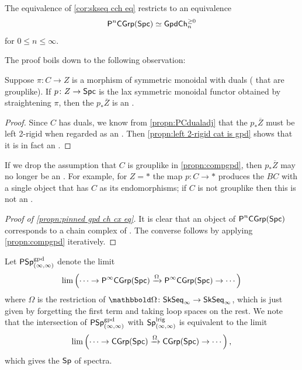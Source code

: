 \documentclass[a4paper,11pt]{article}
\begin{document}
\begin{propn}\label{propn:pinned gpd ch cx eq}
  The equivalence of \cref{cor:skseq cch eq} restricts to an
  equivalence
  \[ \PCGrp[n] \simeq \GpdChp_{n}\]
  for $0 \leq n \leq \infty$.
\end{propn}

The proof boils down to the following observation:
\begin{lemma}\label{propn:compgpd}
  Suppose $\pi \colon C \to Z$ is a morphism of symmetric monoidal
  \igpds{} with duals (\ie{} that are grouplike). If $p \colon Z \to
  \Spc$ is the lax symmetric monoidal functor obtained by
  straightening $\pi$, then the \icat{} $p_{*}\overline{Z}$ is an
  \igpd{}.
\end{lemma}
\begin{proof}
  Since $C$ has duals, we know from \cref{propn:PCdualadj} that the
  \icat{} $p_{*}\overline{Z}$ must be left 2-rigid when regarded as an
  \itcat{}. Then \cref{propn:left 2-rigid cat is gpd} shows that it is
  in fact an \igpd{}.
\end{proof}

\begin{remark}
  If we drop the assumption that $C$ is grouplike in
  \cref{propn:compgpd}, then $p_{*}\overline{Z}$ may no longer be an
  \igpd{}. For example, for $Z = *$ the map $p \colon C \to *$
  produces the \icat{} $BC$ with a single object that has $C$ as its
  endomorphisms; if $C$ is not grouplike then this is not an \igpd{}.
\end{remark}

\begin{proof}[Proof of \cref{propn:pinned gpd ch cx eq}]
  It is clear that an object of $\PCGrp[n]$ corresponds to a chain
  complex of \igpds{}. The converse follows by applying
  \cref{propn:compgpd} iteratively.
\end{proof}

\begin{notation}
  Let $\PSpIIgpd$ denote the limit
  \[ \lim \left( \cdots \to \PCGrp[\infty] \xto{\Omega} \PCGrp[\infty]
      \to \cdots
    \right)\]
  where $\Omega$ is the restriction of $\mOm \colon \SkSeqI \to
  \SkSeqI$, which is just given by forgetting the first term and
  taking loop spaces on the rest. We note that the intersection of
  $\PSpIIgpd$ with $\SpIIl$ is equivalent to the limit
    \[ \lim \left( \cdots \to \CGrp(\Spc) \xto{\Omega} \CGrp(\Spc)
      \to \cdots
    \right),\]
  which gives the \icat{} $\Sp$ of spectra.
\end{notation}
\end{document}
